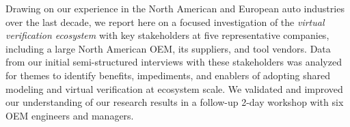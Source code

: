 
Drawing on our experience in the North American and European auto industries over the last decade, we report here on a focused investigation of the \emph{virtual verification ecosystem} with key stakeholders at five representative companies, including a large North American OEM, its suppliers, and tool vendors.
Data from our initial semi-structured interviews with these stakeholders was analyzed for themes to identify benefits, impediments, and enablers of adopting shared modeling and virtual verification 
at ecosystem scale.
We validated and improved our understanding of our research results in a follow-up 2-day workshop with six OEM engineers and managers.

